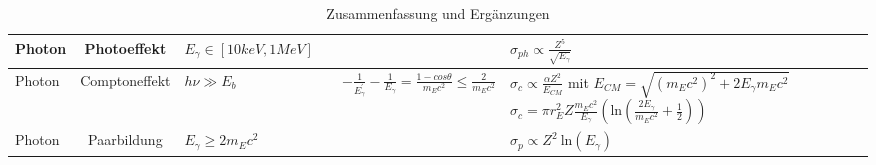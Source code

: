 \documentclass[Ex4_Zusammenfassung.tex]{subfiles}
\begin{document}
\begin{table}
\begin{tabular} {p{1.6cm} | c | p{3.5cm} | p{4cm} | p{5cm} | p{5.5cm} }
              Photon & Photoeffekt & $E_{\gamma} \in [10 keV,1 MeV] $ & & & $ \sigma_{ph} \propto \frac{Z^5}{\sqrt{E_{\gamma}}} $ \\ 
              \hline
              
              Photon & Comptoneffekt & $h \nu \gg E_b$ & & $ - \frac{1}{E_{\gamma}^{'}} - \frac{1}{E_{\gamma}} = \frac{1 - cos \theta}{m_E c^2}  \leq \frac{2}{m_E c^2} $ & $ \sigma_{c} \propto \frac{\alpha Z^2}{E_{CM}} $ 
             \newline \newline mit  \newline $ E_{CM} = \sqrt{(m_E c^2)^2 + 2 E_{\gamma} m_E c^2} $ \newline \newline $ \sigma_{c} = \pi r_E^2 Z \frac{m_E c^2}{E_{\gamma}} \left( \text{ln}  \left(\frac{2 E_{\gamma}}{m_E c^2}  + \frac{1}{2} \right) \right)$ \\ 
              \hline
              
              Photon & Paarbildung & $ E_{\gamma} \geq 2 m_E c^2$ & & & $ \sigma_{p} \propto Z^2 \  \text{ln} (E_{\gamma}) $ \\
           \bottomrule
        \end{tabular}\hspace*{-1cm}
        \caption{Zusammenfassung und Ergänzungen}
	\end{table}
\end{document}
